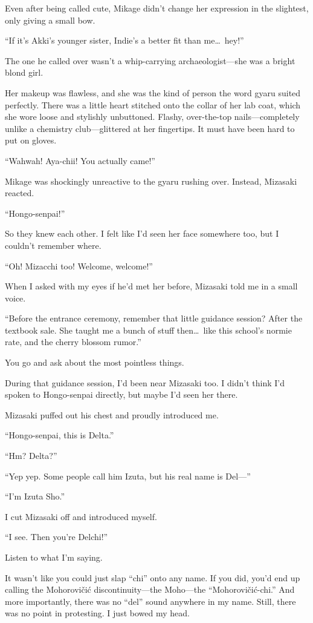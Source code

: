 \documentclass[
    a4paper,
    12pt,
    twoside,
    openany,
    UTF8,
    fontset=windows
]{ctexbook}
\begin{document}
Even after being called cute, Mikage didn't change her expression in the slightest, only giving a small bow.

``If it's Akki's younger sister, Indie's a better fit than me\dots\ hey!''

The one he called over wasn't a whip-carrying archaeologist---she was a bright blond girl.

Her makeup was flawless, and she was the kind of person the word gyaru suited perfectly. There was a little heart stitched onto the collar of her lab coat, which she wore loose and stylishly unbuttoned. Flashy, over-the-top nails---completely unlike a chemistry club---glittered at her fingertips. It must have been hard to put on gloves.

``Wahwah! Aya-chii! You actually came!''

Mikage was shockingly unreactive to the gyaru rushing over. Instead, Mizasaki reacted.

``Hongo-senpai!''

So they knew each other. I felt like I'd seen her face somewhere too, but I couldn't remember where.

``Oh! Mizacchi too! Welcome, welcome!''

When I asked with my eyes if he'd met her before, Mizasaki told me in a small voice.

``Before the entrance ceremony, remember that little guidance session? After the textbook sale. She taught me a bunch of stuff then\dots\ like this school's normie rate, and the cherry blossom rumor.''

You go and ask about the most pointless things.

During that guidance session, I'd been near Mizasaki too. I didn't think I'd spoken to Hongo-senpai directly, but maybe I'd seen her there.

Mizasaki puffed out his chest and proudly introduced me.

``Hongo-senpai, this is Delta.''

``Hm? Delta?''

``Yep yep. Some people call him Izuta, but his real name is Del---''

``I'm Izuta Sho.''

I cut Mizasaki off and introduced myself.

``I see. Then you're Delchi!''

Listen to what I'm saying.

It wasn't like you could just slap ``chi'' onto any name. If you did, you'd end up calling the Mohorovi\v{c}i\'{c} discontinuity---the Moho---the ``Mohorovi\v{c}i\'{c}-chi.'' And more importantly, there was no ``del'' sound anywhere in my name. Still, there was no point in protesting. I just bowed my head.
\end{document}
